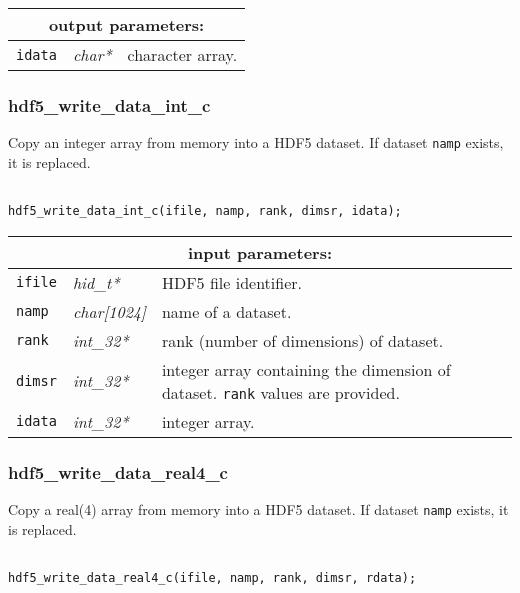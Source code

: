 \vskip 0.8cm

\noindent
\begin{tabular}{|p{1.5cm}|p{2cm}|p{11cm}|}
\hline
\multicolumn{3}{|c|}{\bf output parameters:} \\
\hline
{\tt idata} & {\it char*} & character array. \\
\hline
\end{tabular}

\subsubsection{hdf5\_write\_data\_int\_c}

Copy an integer array from memory into a HDF5 dataset. If dataset {\tt namp} exists, it is replaced.

\begin{verbatim}

hdf5_write_data_int_c(ifile, namp, rank, dimsr, idata);
\end{verbatim}

\noindent
\begin{tabular}{|p{1.5cm}|p{2cm}|p{11cm}|}
\hline
\multicolumn{3}{|c|}{\bf input parameters:} \\
\hline
{\tt ifile} & {\it hid\_t*} & HDF5 file identifier. \\
\hline
{\tt namp} & {\it char[1024]} & name of a dataset. \\
\hline
{\tt rank} & {\it int\_32*} & rank (number of dimensions) of dataset. \\
\hline
{\tt dimsr} & {\it int\_32*} & integer array containing the dimension of dataset. {\tt rank} values are provided. \\
\hline
{\tt idata} & {\it int\_32*} & integer array. \\
\hline
\end{tabular}

\subsubsection{hdf5\_write\_data\_real4\_c}

Copy a real(4) array from memory into a HDF5 dataset. If dataset {\tt namp} exists, it is replaced.

\begin{verbatim}

hdf5_write_data_real4_c(ifile, namp, rank, dimsr, rdata);
\end{verbatim}

